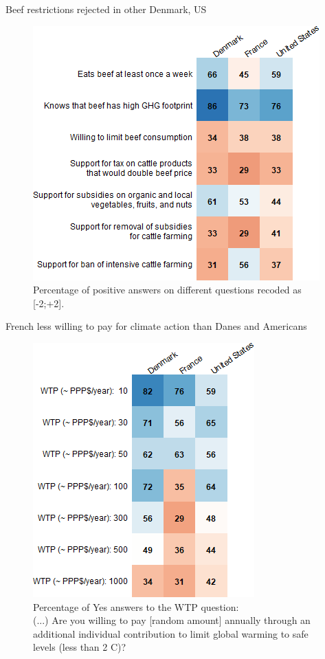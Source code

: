 \begin{framefont}{\small}
\begin{frame}{Beef restrictions rejected in other Denmark, US}%
\begin{figure}[h!]
\caption{Percentage of positive answers on different questions recoded as [-2;+2].}
\includegraphics[width=.5\paperwidth]{../figures/country_comparison/beef_positive_countries.png} 
\end{figure}
\end{frame}  %

\begin{frame}{French less willing to pay for climate action than Danes and Americans}%
\begin{figure}[h!]
\caption{Percentage of Yes answers to the WTP question: \\
(...) Are you willing to pay [random amount] annually through an additional individual contribution to limit global warming to safe levels (less than 2 \degree{}C)?}
\includegraphics[height=.7\paperheight]{../figures/country_comparison/wtp_positive_countries.png} 
\end{figure}
\end{frame} 



\end{framefont}
